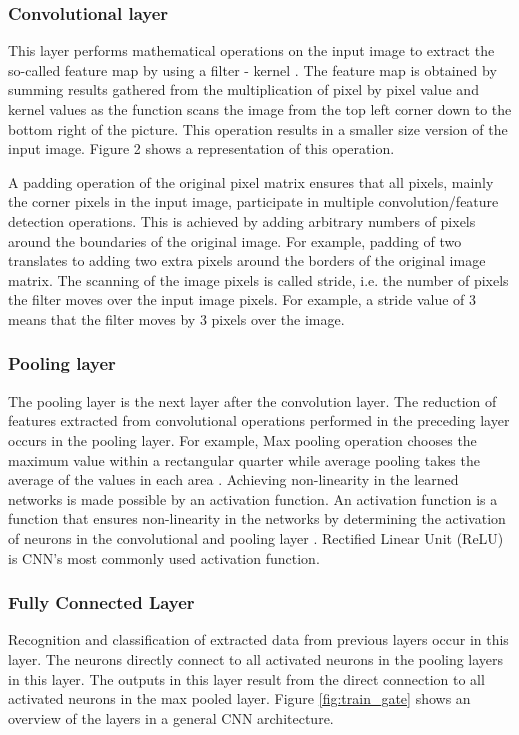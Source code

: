 \documentclass[conference]{IEEEtran}
\begin{document}
\subsubsection{Convolutional layer}
This layer performs mathematical operations on the input image to extract the so-called feature map by using a filter - kernel \cite{goodfellow2016deep}. The feature map is obtained by summing results gathered from the multiplication of pixel by pixel value and kernel values as the function scans the image from the top left corner down to the bottom right of the picture. This operation results in a smaller size version of the input image. Figure 2 shows a representation of this operation.

A padding operation of the original pixel matrix ensures that all pixels, mainly the corner pixels in the input image, participate in multiple convolution/feature detection operations. This is achieved by adding arbitrary numbers of pixels around the boundaries of the original image. For example, padding of two translates to adding two extra pixels around the borders of the original image matrix. The scanning of the image pixels is called stride, i.e. the number of pixels the filter moves over the input image pixels. For example, a stride value of 3 means that the filter moves by 3 pixels over the image.


\subsubsection{Pooling layer}
The pooling layer is the next layer after the convolution layer. The reduction of features extracted from convolutional operations performed in the preceding layer occurs in the pooling layer. For example, Max pooling operation chooses the maximum value within a rectangular quarter while average pooling takes the average of the values in each area \cite{goodfellow2016deep}.
Achieving non-linearity in the learned networks is made possible by an activation function.
An activation function is a function that ensures non-linearity in the networks by determining the activation of neurons in the convolutional and pooling layer \cite{nielsen2015neural}. Rectified Linear Unit (ReLU) is CNN's most commonly used activation function.



\subsubsection{Fully Connected Layer}
Recognition and classification of extracted data from previous layers occur in this layer. The neurons directly connect to all activated neurons in the pooling layers in this layer. The outputs in this layer result from the direct connection to all activated neurons in the max pooled layer. Figure \ref{fig:train_gate} shows an overview of the layers in a general CNN architecture.
\end{document}
